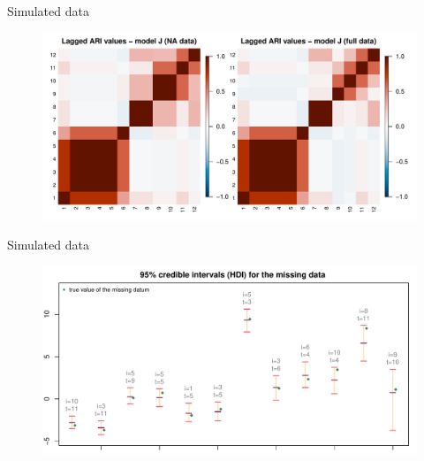 \documentclass[
	11pt, %
 xcolor={dvipsnames,svgnames}
]{beamer}
\begin{document}
\begin{frame}{Simulated data}

\begin{figure}[!ht]
    \centering
    \includegraphics[width=1\linewidth]{Testing/NA data/no space NA/ari.pdf}
    \label{fig:ari no space NA}
\end{figure}
\end{frame}

\begin{frame}{Simulated data}
    
\begin{figure}[!ht]
    \centering
    \includegraphics[width=1\linewidth]{Testing/NA data/no space NA/target_only_NA_CIs_SORTED.pdf}
    \label{fig: CIs target only}
\end{figure}
\end{frame}
\end{document}
